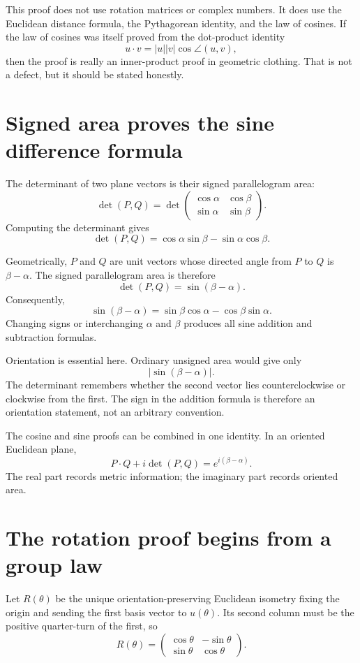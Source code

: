 This proof does not use rotation matrices or complex numbers.  It does use the Euclidean distance formula, the Pythagorean identity, and the law of cosines.  If the law of cosines was itself proved from the dot-product identity
\[
  u\cdot v=|u||v|\cos\angle(u,v),
\]
then the proof is really an inner-product proof in geometric clothing.  That is not a defect, but it should be stated honestly.

\section{Signed area proves the sine difference formula}

The determinant of two plane vectors is their signed parallelogram area:
\[
  \det(P,Q)
  =
  \det
  \begin{pmatrix}
    \cos\alpha&\cos\beta\\
    \sin\alpha&\sin\beta
  \end{pmatrix}.
\]
Computing the determinant gives
\[
  \det(P,Q)
  =\cos\alpha\sin\beta-\sin\alpha\cos\beta.
\]

Geometrically, \(P\) and \(Q\) are unit vectors whose directed angle from \(P\) to \(Q\) is \(\beta-\alpha\).  The signed parallelogram area is therefore
\[
  \det(P,Q)=\sin(\beta-\alpha).
\]
Consequently,
\[
  \boxed{
  \sin(\beta-\alpha)
  =\sin\beta\cos\alpha-\cos\beta\sin\alpha.}
\]
Changing signs or interchanging \(\alpha\) and \(\beta\) produces all sine addition and subtraction formulas.

Orientation is essential here.  Ordinary unsigned area would give only
\[
  |\sin(\beta-\alpha)|.
\]
The determinant remembers whether the second vector lies counterclockwise or clockwise from the first.  The sign in the addition formula is therefore an orientation statement, not an arbitrary convention.

The cosine and sine proofs can be combined in one identity.  In an oriented Euclidean plane,
\[
  P\cdot Q+i\det(P,Q)
  =e^{i(\beta-\alpha)}.
\]
The real part records metric information; the imaginary part records oriented area.

\section{The rotation proof begins from a group law}

Let \(R(\theta)\) be the unique orientation-preserving Euclidean isometry fixing the origin and sending the first basis vector to \(u(\theta)\).  Its second column must be the positive quarter-turn of the first, so
\[
  R(\theta)=
  \begin{pmatrix}
    \cos\theta&-\sin\theta\\
    \sin\theta&\cos\theta
  \end{pmatrix}.
\]


